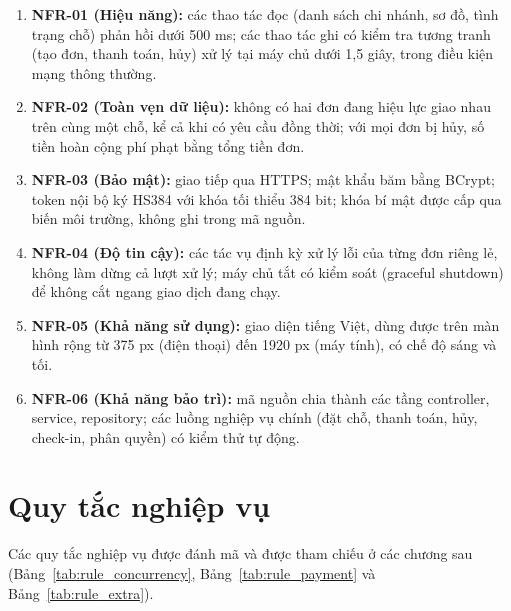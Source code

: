 \begin{enumerate}
    \item \textbf{NFR-01 (Hiệu năng):} các thao tác đọc (danh sách chi nhánh, sơ đồ, tình trạng chỗ) phản hồi dưới 500 ms; các thao tác ghi có kiểm tra tương tranh (tạo đơn, thanh toán, hủy) xử lý tại máy chủ dưới 1,5 giây, trong điều kiện mạng thông thường.
    \item \textbf{NFR-02 (Toàn vẹn dữ liệu):} không có hai đơn đang hiệu lực giao nhau trên cùng một chỗ, kể cả khi có yêu cầu đồng thời; với mọi đơn bị hủy, số tiền hoàn cộng phí phạt bằng tổng tiền đơn.
    \item \textbf{NFR-03 (Bảo mật):} giao tiếp qua HTTPS; mật khẩu băm bằng BCrypt; token nội bộ ký HS384 với khóa tối thiểu 384 bit; khóa bí mật được cấp qua biến môi trường, không ghi trong mã nguồn.
    \item \textbf{NFR-04 (Độ tin cậy):} các tác vụ định kỳ xử lý lỗi của từng đơn riêng lẻ, không làm dừng cả lượt xử lý; máy chủ tắt có kiểm soát (graceful shutdown) để không cắt ngang giao dịch đang chạy.
    \item \textbf{NFR-05 (Khả năng sử dụng):} giao diện tiếng Việt, dùng được trên màn hình rộng từ 375 px (điện thoại) đến 1920 px (máy tính), có chế độ sáng và tối.
    \item \textbf{NFR-06 (Khả năng bảo trì):} mã nguồn chia thành các tầng controller, service, repository; các luồng nghiệp vụ chính (đặt chỗ, thanh toán, hủy, check-in, phân quyền) có kiểm thử tự động.
\end{enumerate}

\section{Quy tắc nghiệp vụ}
\label{sec:quytac_nghiepvu}

Các quy tắc nghiệp vụ được đánh mã  và được tham chiếu ở các chương sau (Bảng~\ref{tab:rule_concurrency}, Bảng~\ref{tab:rule_payment} và Bảng~\ref{tab:rule_extra}).

